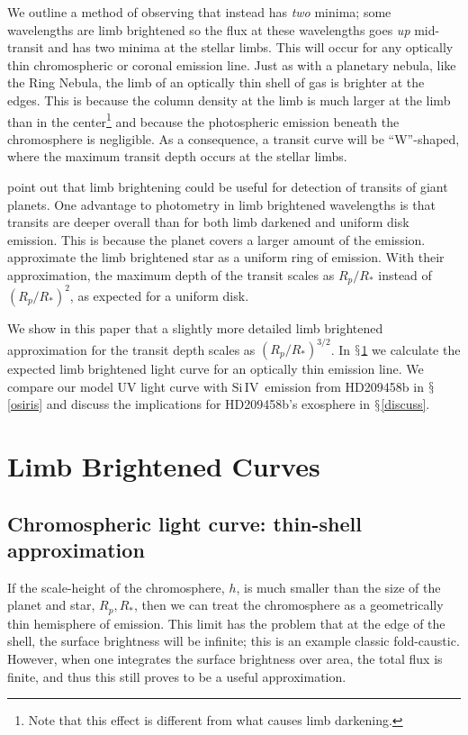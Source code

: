 \documentclass[manuscript]{aastex}
\newcommand{\siIV}{\ensuremath{\mathrm{Si}\,\scriptstyle \mathrm{IV}}}
\begin{document}
We outline a method of observing that instead has {\it two} minima; some
wavelengths are limb brightened so the flux at these wavelengths goes
{\it up} mid-transit and has two minima at the stellar limbs. This will occur for any optically thin
chromospheric or coronal emission line. Just as with a planetary
nebula, like the Ring Nebula, the limb of an optically thin shell of
gas is brighter at the edges. This is because the column density at
the limb is much larger at the limb than in the center\footnote{Note
that this effect is different from what causes limb darkening.} and because the photospheric emission beneath the chromosphere is negligible. As a
consequence, a transit curve will be ``W''-shaped, where the maximum
transit depth occurs at the stellar limbs.

\citet{assef} point out that limb brightening could be
useful for detection of transits of giant planets. One advantage
to photometry in limb brightened wavelengths is that transits are
deeper overall than for both limb darkened and uniform disk
emission. This is because the planet covers a larger amount of the
emission. \citet{assef} approximate the limb brightened
star as a uniform ring of emission. With their approximation, the maximum depth
of the transit scales as $R_p/R_*$ instead of $(R_p/R_*)^2$,
as expected for a uniform disk.

We show in this paper that a slightly more detailed limb brightened
approximation for the transit depth scales as $(R_p/R_*)^{3/2}$. In
$\mathsection$\ref{labl:chromlcurve} we calculate the expected limb
brightened light curve for an optically thin emission line. We
compare our model UV light curve with \siIV\ emission from HD209458b in  $\mathsection$\ref{osiris} and discuss the implications for HD209458b's exosphere in $\mathsection$\ref{discuss}.

\section{Limb Brightened Curves} \label{labl:chromlcurve}

\subsection{Chromospheric light curve: thin-shell approximation}
\label{labl:thinshell}
If the scale-height of the chromosphere, $h$, is much smaller than the
size of the planet and star, $R_p, R_*$, then we can treat the
chromosphere as a geometrically thin hemisphere of emission.  This
limit has the problem that at the edge of the shell, the surface
brightness will be infinite; this is an example classic fold-caustic.
However, when one integrates the surface brightness over area, the
total flux is finite, and thus this still proves to be a useful
approximation.
\end{document}
